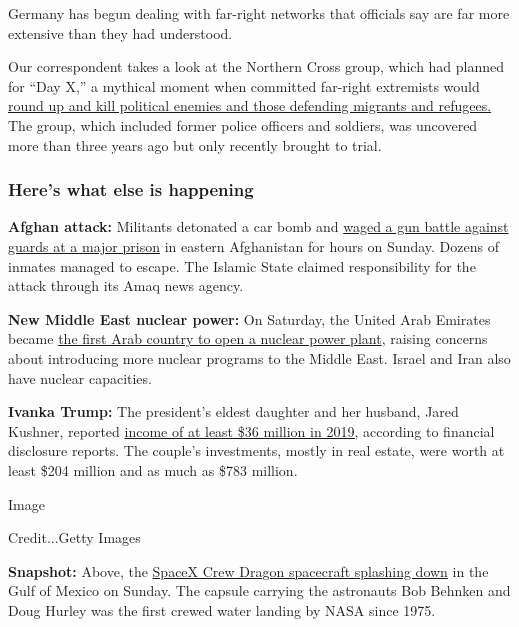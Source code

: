 Germany has begun dealing with far-right networks that officials say are
far more extensive than they had understood.

Our correspondent takes a look at the Northern Cross group, which had
planned for ``Day X,'' a mythical moment when committed far-right
extremists would
\href{https://www.nytimes.com/2020/08/01/world/europe/germany-nazi-infiltration.html}{round
up and kill political enemies and those defending migrants and
refugees.} The group, which included former police officers and
soldiers, was uncovered more than three years ago but only recently
brought to trial.

\hypertarget{heres-what-else-is-happening}{%
\subsubsection{Here's what else is
happening}\label{heres-what-else-is-happening}}

\textbf{Afghan attack:} Militants detonated a car bomb and
\href{https://www.nytimes.com/2020/08/02/world/asia/afghan-prison-attack-prisoners.html}{waged
a gun battle against guards at a major prison} in eastern Afghanistan
for hours on Sunday. Dozens of inmates managed to escape. The Islamic
State claimed responsibility for the attack through its Amaq news
agency.

\textbf{New Middle East nuclear power:} On Saturday, the United Arab
Emirates became
\href{https://www.nytimes.com/2020/08/01/world/middleeast/uae-nuclear-Barakah.html}{the
first Arab country to open a nuclear power plant}, raising concerns
about introducing more nuclear programs to the Middle East. Israel and
Iran also have nuclear capacities.

\textbf{Ivanka Trump:} The president's eldest daughter and her husband,
Jared Kushner, reported
\href{https://www.nytimes.com/2020/08/01/business/ivanka-trump-jared-kushner-financial-disclosure.html}{income
of at least \$36 million in 2019,} according to financial disclosure
reports. The couple's investments, mostly in real estate, were worth at
least \$204 million and as much as \$783 million.

Image

Credit...Getty Images

\textbf{Snapshot:} Above, the
\href{https://www.nytimes.com/2020/08/02/science/spacex-nasa-return.html}{SpaceX
Crew Dragon spacecraft splashing down} in the Gulf of Mexico on Sunday.
The capsule carrying the astronauts Bob Behnken and Doug Hurley was the
first crewed water landing by NASA since 1975.

